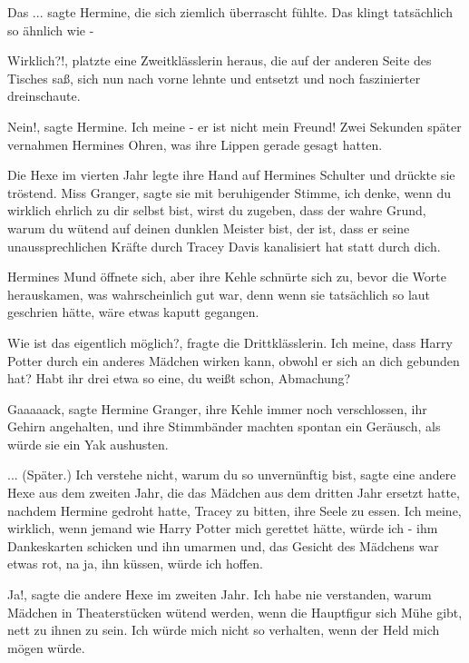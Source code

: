 \glqq{}Das ...\grqq{} sagte Hermine, die sich ziemlich überrascht fühlte. \glqq{}
Das klingt tatsächlich so ähnlich wie -\grqq{}

\glqq{}Wirklich?!\grqq{}, platzte eine Zweitklässlerin heraus, die auf der
anderen Seite des Tisches saß, sich nun nach vorne lehnte und entsetzt und noch
faszinierter dreinschaute.

\glqq{}Nein!\grqq{}, sagte Hermine. \glqq{}Ich meine - er ist nicht mein
Freund!\grqq{} Zwei Sekunden später vernahmen Hermines Ohren, was ihre Lippen
gerade gesagt hatten.

Die Hexe im vierten Jahr legte ihre Hand auf Hermines Schulter und drückte sie
tröstend. \glqq{}Miss Granger\grqq{}, sagte sie mit beruhigender Stimme, \glqq{}
ich denke, wenn du wirklich ehrlich zu dir selbst bist, wirst du zugeben, dass
der wahre Grund, warum du wütend auf deinen dunklen Meister bist, der ist, dass
er seine unaussprechlichen Kräfte durch Tracey Davis kanalisiert hat statt durch
dich.\grqq{}

Hermines Mund öffnete sich, aber ihre Kehle schnürte sich zu, bevor die Worte
herauskamen, was wahrscheinlich gut war, denn wenn sie tatsächlich so laut
geschrien hätte, wäre etwas kaputt gegangen.

\glqq{}Wie ist das eigentlich möglich?\grqq{}, fragte die Drittklässlerin. \glqq{}
Ich meine, dass Harry Potter durch ein anderes Mädchen wirken kann, obwohl er
sich an dich gebunden hat? Habt ihr drei etwa so eine, du weißt schon,
Abmachung?\grqq{}

\glqq{}Gaaaaack\grqq{}, sagte Hermine Granger, ihre Kehle immer noch
verschlossen, ihr Gehirn angehalten, und ihre Stimmbänder machten spontan ein
Geräusch, als würde sie ein Yak aushusten.

... (Später.) \glqq{}Ich verstehe nicht, warum du so unvernünftig bist\grqq{},
sagte eine andere Hexe aus dem zweiten Jahr, die das Mädchen aus dem dritten
Jahr ersetzt hatte, nachdem Hermine gedroht hatte, Tracey zu bitten, ihre Seele
zu essen. \glqq{}Ich meine, wirklich, wenn jemand wie Harry Potter mich gerettet
hätte, würde ich - ihm Dankeskarten schicken und ihn umarmen und\grqq{}, das
Gesicht des Mädchens war etwas rot, \glqq{}na ja, ihn küssen, würde ich
hoffen.\grqq{}

\glqq{}Ja!\grqq{}, sagte die andere Hexe im zweiten Jahr. \glqq{}Ich habe nie
verstanden, warum Mädchen in Theaterstücken wütend werden, wenn die Hauptfigur
sich Mühe gibt, nett zu ihnen zu sein. Ich würde mich nicht so verhalten, wenn
der Held mich mögen würde.\grqq{}

